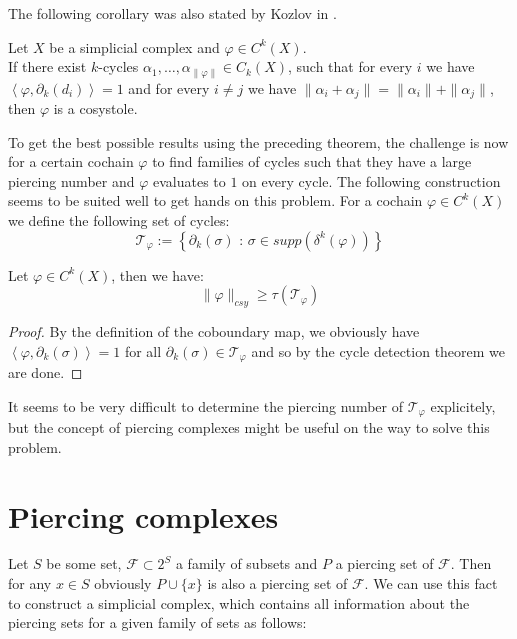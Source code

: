 The following corollary was also stated by Kozlov in \cite{6}.

\begin{cor}
Let \(X\) be a simplicial complex and \(\varphi\in C^k(X)\).\\
If there exist \(k\)-cycles \(\alpha_1,\ldots,\alpha_{\|\varphi\|}\in C_k(X)\), such that for every \(i\) we have \(\left\langle\varphi,\partial_k(d_i)\right\rangle = 1\) and for every \(i\neq j\) we have \(\|\alpha_i+\alpha_j\|=\|\alpha_i\|+\|\alpha_j\|\), then \(\varphi\) is a cosystole.
\end{cor}

To get the best possible results using the preceding theorem, the challenge is now for a certain cochain \(\varphi\) to find families of cycles such that they have a large piercing number and \(\varphi\) evaluates to \(1\) on every cycle. The following construction seems to be suited well to get hands on this problem. For a cochain \(\varphi\in C^k(X)\) we define the following set of cycles:
\[
\mathcal{T}_{\varphi}:=\left\{\partial_k(\sigma)\text{ : }\sigma\in supp(\delta^k(\varphi))\right\}
\]

\begin{prop}
Let \(\varphi\in C^k(X)\), then we have:
\[
\|\varphi\|_{csy}\geq\tau(\mathcal{T}_{\varphi})
\]
\begin{proof}
By the definition of the coboundary map, we obviously have\\
\(\left\langle\varphi,\partial_k(\sigma)\right\rangle=1\) for all \(\partial_k(\sigma)\in\mathcal{T}_{\varphi}\) and so by the cycle detection theorem we are done.
\end{proof}
\end{prop}

It seems to be very difficult to determine the piercing number of \(\mathcal{T}_{\varphi}\) explicitely, but the concept of piercing complexes might be useful on the way to solve this problem.

\section{Piercing complexes}

Let \(S\) be some set, \(\mathcal{F}\subset 2^S\) a family of subsets and \(P\) a piercing set of \(\mathcal{F}\). Then for any \(x\in S\) obviously \(P\cup\{x\}\) is also a piercing set of \(\mathcal{F}\). We can use this fact to construct a simplicial complex, which contains all information about the piercing sets for a given family of sets as follows:

